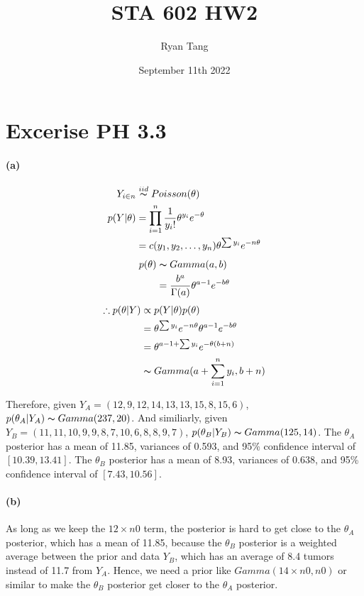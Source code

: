 \documentclass[11pt, letterpaper]{article}
\title{STA 602 HW2}
\author{Ryan Tang}
\date{September 11th 2022}
\begin{document}
\maketitle

\section{Excerise PH 3.3}
\paragraph{(a)}
\begin{align*}
  Y_{i \in n} &\overset{iid}{\thicksim} Poisson(\theta) \\
  p(Y|\theta) &= \prod_{i=1}^{n} \frac{1}{y_i!} \theta^{y_i} e^{-\theta} \\
    &= c(y_1, y_2, \dots, y_n) \theta^{\sum y_i} e^{-n\theta}
\end{align*}
\begin{align*}
  p(\theta) &\thicksim Gamma(a, b) \\
    &= \frac{b^a}{\Gamma(a)} \theta^{a-1} e^{-b\theta}
\end{align*}
\begin{align*}
  \therefore p(\theta|Y) &\propto p(Y|\theta) p(\theta) \\
    &= \theta^{\sum y_i} e^{-n\theta} \theta^{a-1} e^{-b\theta} \\
    &= \theta^{a - 1 + \sum y_i} e^{-\theta(b+n)} \\
    &\thicksim Gamma(a + \sum_{i=1}^{n} y_i, b + n)
\end{align*}

Therefore, given $Y_A = (12, 9, 12, 14, 13, 13, 15, 8, 15, 6)$, $p(\theta_A|Y_A) \thicksim Gamma(237, 20)$.
And similiarly, given $Y_B = (11, 11, 10, 9, 9, 8, 7, 10, 6, 8, 8, 9, 7)$, $p(\theta_B|Y_B) \thicksim Gamma(125, 14)$.
The $\theta_A$ posterior has a mean of 11.85, variances of 0.593, and 95\% confidence interval of $[10.39, 13.41]$.
The $\theta_B$ posterior has a mean of 8.93, variances of 0.638, and 95\% confidence interval of $[7.43, 10.56]$.

\newpage
\paragraph{(b)}
As long as we keep the $12 \times n0$ term, the posterior is hard to get close to the $\theta_A$ posterior,
which has a mean of 11.85, because the $\theta_B$ posterior is a weighted average between the prior and
data $Y_B$, which has an average of 8.4 tumors instead of 11.7 from $Y_A$. Hence, we need a prior like
$Gamma(14 \times n0, n0)$ or similar to make the $\theta_B$ posterior get closer to the $\theta_A$ posterior.
\end{document}
